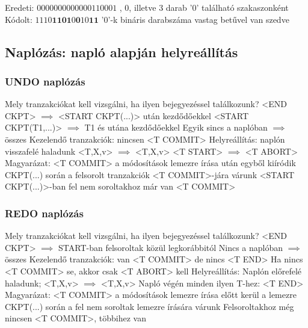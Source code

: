\documentclass[12pt,a4paper]{article}
\begin{document}
\begin{outline}
	\1 Eredeti: $0000000000000110001$
		, 0, illetve 3 darab '0' található szakaszonként
	\1 Kódolt: $1110\textbf{1101}0\textbf{0}10\textbf{11}$
		\2 '0'-k bináris darabszáma vastag betűvel van szedve
\end{outline}

\subsection{Naplózás: napló alapján helyreállítás}

\subsubsection{UNDO naplózás}

\begin{outline}
	\1 Mely tranzakciókat kell vizsgálni, ha ilyen bejegyezéssel találkozunk?
		\2 <END CKPT> $\implies$ <START CKPT(...)> után kezdődőekkel
		\2 <START CKPT(T1,...)> $\implies$ T1 és utána kezdődőekkel
		\2 Egyik sincs a naplóban $\implies$ összes
	\1 Kezelendő tranzakciók: nincsen <T COMMIT>
	\1 Helyreállítás: naplón visszafelé haladunk
		\2 <T,X,v> $\implies$ <T,X,v>
		\2 <T START> $\implies$ <T ABORT>
	\1 Magyarázat:
		\2 <T COMMIT> a módosítások lemezre írása után egyből kiíródik
		\2 CKPT(...) során a felsorolt tranzakciók <T COMMIT>-jára várunk
		\2 <START CKPT(...)>-ban fel nem soroltakhoz már van <T COMMIT>
\end{outline}

\subsubsection{REDO naplózás}

\begin{outline}
	\1 Mely tranzakciókat kell vizsgálni, ha ilyen bejegyezéssel találkozunk?
		\2 <END CKPT> $\implies$ START-ban felsoroltak közül legkorábbitól
		\2 Nincs a naplóban $\implies$ összes
	\1 Kezelendő tranzakciók: van <T COMMIT> de nincs <T END>
		\2 Ha nincs <T COMMIT> se, akkor csak <T ABORT> kell
	\1 Helyreállítás:
		\2 Naplón előrefelé haladunk; <T,X,v> $\implies$ <T,X,v>
		\2 Napló végén minden ilyen T-hez: <T END>
	\1 Magyarázat:
		\2 <T COMMIT> a módosítások lemezre írása előtt kerül a lemezre
		\2 CKPT(...) során a fel nem soroltak lemezre írására várunk
			\3 Felsoroltakhoz még nincsen <T COMMIT>, többihez van
\end{outline}
\end{document}
